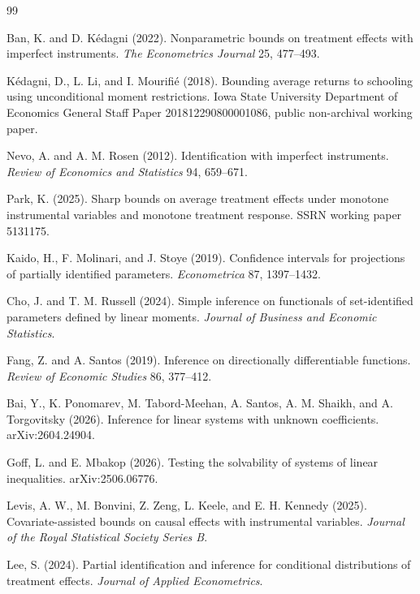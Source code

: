 \documentclass{article}
\begin{document}
\begin{thebibliography}{99}

   Ban, K. and D. Kédagni (2022). Nonparametric bounds on treatment effects with imperfect instruments. \emph{The Econometrics Journal} 25, 477--493.

   Kédagni, D., L. Li, and I. Mourifié (2018). Bounding average returns to schooling using unconditional moment restrictions. Iowa State University Department of Economics General Staff Paper 201812290800001086, public non-archival working paper.

   Nevo, A. and A. M. Rosen (2012). Identification with imperfect instruments. \emph{Review of Economics and Statistics} 94, 659--671.

   Park, K. (2025). Sharp bounds on average treatment effects under monotone instrumental variables and monotone treatment response. SSRN working paper 5131175.

   Kaido, H., F. Molinari, and J. Stoye (2019). Confidence intervals for projections of partially identified parameters. \emph{Econometrica} 87, 1397--1432.

   Cho, J. and T. M. Russell (2024). Simple inference on functionals of set-identified parameters defined by linear moments. \emph{Journal of Business and Economic Statistics}.

   Fang, Z. and A. Santos (2019). Inference on directionally differentiable functions. \emph{Review of Economic Studies} 86, 377--412.

   Bai, Y., K. Ponomarev, M. Tabord-Meehan, A. Santos, A. M. Shaikh, and A. Torgovitsky (2026). Inference for linear systems with unknown coefficients. arXiv:2604.24904.

   Goff, L. and E. Mbakop (2026). Testing the solvability of systems of linear inequalities. arXiv:2506.06776.

   Levis, A. W., M. Bonvini, Z. Zeng, L. Keele, and E. H. Kennedy (2025). Covariate-assisted bounds on causal effects with instrumental variables. \emph{Journal of the Royal Statistical Society Series B}.

   Lee, S. (2024). Partial identification and inference for conditional distributions of treatment effects. \emph{Journal of Applied Econometrics}.


\end{thebibliography}
\end{document}
